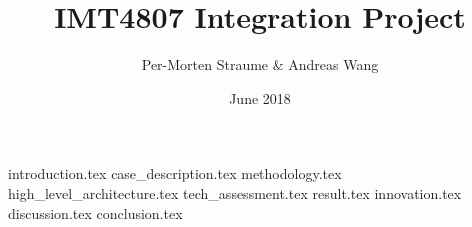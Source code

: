 \documentclass{article}
\title{IMT4807 Integration Project}
\author{Per-Morten Straume \& Andreas Wang}
\date{June 2018}
\begin{document}
\maketitle



%
%


{introduction.tex}
{case_description.tex}
{methodology.tex} %
{high_level_architecture.tex}
{tech_assessment.tex}
{result.tex}
{innovation.tex}
{discussion.tex}
{conclusion.tex}




\end{document}
